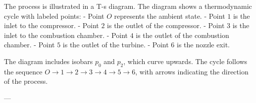 The process is illustrated in a T-s diagram. The diagram shows a thermodynamic cycle with labeled points:  
- Point \( O \) represents the ambient state.  
- Point \( 1 \) is the inlet to the compressor.  
- Point \( 2 \) is the outlet of the compressor.  
- Point \( 3 \) is the inlet to the combustion chamber.  
- Point \( 4 \) is the outlet of the combustion chamber.  
- Point \( 5 \) is the outlet of the turbine.  
- Point \( 6 \) is the nozzle exit.  

The diagram includes isobars \( p_0 \) and \( p_2 \), which curve upwards. The cycle follows the sequence \( O \to 1 \to 2 \to 3 \to 4 \to 5 \to 6 \), with arrows indicating the direction of the process.  

---